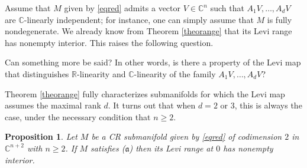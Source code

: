 \documentclass[10pt,a4paper]{amsart}
\newcommand{\C}{\mathbb C}
\newcommand{\R}{\mathbb R}
\newtheorem{prop}[theo]{Proposition}
\numberwithin{equation}{section}
\begin{document}
Assume that  $M$ given by \eqref{eqred} admits a vector $V \in \C^n$ such that $A_1V,\ldots,A_dV$ are $\C$-linearly independent; for instance, one can simply assume that $M$ is fully nondegenerate. We already know from Theorem \ref{theorange} that its Levi range has nonempty interior. This raises the following question. 
 
\vspace{0.1cm}

 Can  something more be said? In other words, is there a property of the Levi map that distinguishes $\R$-linearity and  $\C$-linearity  of the family $A_1V,\ldots,A_dV$? 

\vspace{0.5cm}


Theorem \ref{theorange} fully characterizes submanifolds for which the Levi map assumes the maximal rank $d$. It turns out that when $d=2$ or $3$, this is always the case, under the necessary condition  that $n \ge 2.$


\begin{prop}\label{propd=2}
Let $M$ be a CR submanifold given by \eqref{eqred} of codimension $2$ in $\C^{n+2}$ with $n\ge 2$. If $M$ satisfies ($\mathfrak{a}$)  then its Levi range at $0$ has nonempty interior. 
\end{prop}
\end{document}

